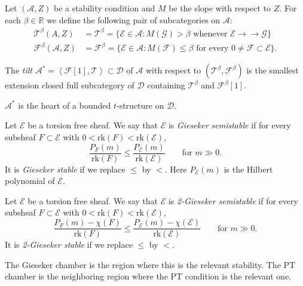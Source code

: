 \documentclass{book}
\begin{document}
\noindent
Let $(\mathcal{A},Z)$ be a stability
condition and $M$ be the slope with
respect to $Z$.
For each $\beta \in \mathbb{R}$
we define the following pair of
subcategories on $\mathcal{A}$:
$$
\begin{aligned}
\mathcal{T}^\beta(A,Z)&=\mathcal{T}^\beta
=\{\mathcal{E} \in \mathcal{A}
: M(\mathcal{G})>\beta
\text{ whenever }
\mathcal{E} \to\!\!\!\!\!\to
\mathcal{G}\}\\
\mathcal{F}^\beta(\mathcal{A},Z)
&=\mathcal{F}^\beta
=\{\mathcal{E} \in \mathcal{A}
:M(\mathcal{F})\leq \beta
\text{ for every }
0 \neq  \mathcal{F} \subset \mathcal{E}\}.
\end{aligned}
$$

\begin{definition}
\label{definition-tilt}
The {\it tilt}
$\mathcal{A}^*
=\left\langle{}\mathcal{F}[1],\mathcal{T}\right\rangle{}
\subset\mathcal{D}$
of $\mathcal{A}$ with respect to
$(\mathcal{T}^\beta,\mathcal{F}^\beta)$
is the smallest extension closed full
subcategory of $\mathcal{D}$ containing
$\mathcal{T}^\beta$ and
$\mathcal{F}^\beta[1]$.
\end{definition}

\noindent
$\mathcal{A}^*$ is the heart of a bounded
$t$-structure on $\mathcal{D}$.

\begin{definition}
\label{definition-gieseker-stability}
Let $\mathcal{E}$ be a torsion free
sheaf.
We say that $\mathcal{E}$ is
{\it Gieseker semistable} if
for every subsheaf $F \subset \mathcal{E}$
with $0 < \mathrm{rk}(F) <
\mathrm{rk}(\mathcal{E})$,
$$
\frac{P_F(m)}{\mathrm{rk}(F)}
\leq
\frac{P_{\mathcal{E}}(m)}{
\mathrm{rk}(\mathcal{E})}
\qquad \text{for } m \gg 0.
$$
It is {\it Gieseker stable}
if we replace $\leq$ by $<$.
Here $P_{\mathcal{E}}(m)$ is the
Hilbert polynomial of $\mathcal{E}$.
\end{definition}

\begin{definition}
\label{definition-2-gieseker-stability}
Let $\mathcal{E}$ be a torsion free
sheaf.
We say that $\mathcal{E}$ is
{\it 2-Gieseker semistable} if
for every subsheaf $F \subset \mathcal{E}$
with $0 < \mathrm{rk}(F) <
\mathrm{rk}(\mathcal{E})$,
$$
\frac{P_F(m)-\chi(F)}{\mathrm{rk}(F)}
\leq
\frac{P_{\mathcal{E}}(m)-\chi(\mathcal{E})}
{\mathrm{rk}(\mathcal{E})}
\qquad \text{for } m \gg 0.
$$
It is {\it 2-Gieseker stable}
if we replace $\leq$ by $<$.
\end{definition}

\noindent
The Gieseker chamber is the region
where this is the relevant stability.
The PT chamber is the neighboring region
where the PT condition is the relevant
one.
\end{document}
